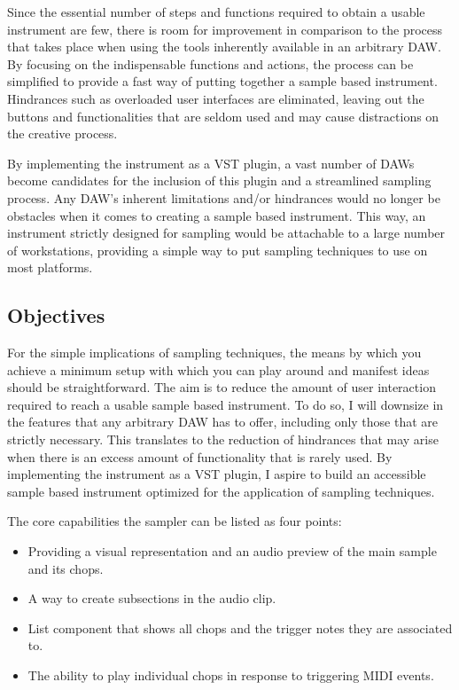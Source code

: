 \documentclass[12pt, a4paper, hidelinks]{article}
\begin{document}
	Since the essential number of steps and functions required to obtain a usable instrument are few, there is room for improvement in comparison to the process that takes place when using the tools inherently available in an arbitrary DAW. By focusing on the indispensable functions and actions, the process can be simplified to provide a fast way of putting together a sample based instrument. Hindrances such as overloaded user interfaces are eliminated, leaving out the buttons and functionalities that are seldom used and may cause distractions on the creative process. \par
	
	By implementing the instrument as a VST plugin, a vast number of DAWs become candidates for the inclusion of this plugin and a streamlined sampling process. Any DAW's inherent limitations and/or hindrances would no longer be obstacles when it comes to creating a sample based instrument. This way, an instrument strictly designed for sampling would be attachable to a large number of workstations, providing a simple way to put sampling techniques to use on most platforms.
	  

	
	
	\newpage
	\subsection{Objectives}

	For the simple implications of sampling techniques, the means by which you achieve a minimum setup with which you can play around and manifest ideas should be straightforward. The aim is to reduce the amount of user interaction required to reach a usable sample based instrument. To do so, I will downsize in the features that any arbitrary DAW has to offer, including only those that are strictly necessary. This translates to the reduction of hindrances that may arise when there is an excess amount of functionality that is rarely used.  By implementing the instrument as a VST plugin, I aspire to build an accessible sample based instrument optimized for the application  of sampling techniques. %
	\par
	The core capabilities the sampler can be listed as four points:
	\begin{itemize}
		\item Providing a visual representation and an audio preview of the main 
		sample and its chops.
		\item A way to create subsections in the audio clip.
		\item List component that shows all chops and the trigger notes they are associated to.
		\item The ability to play individual chops in response to triggering MIDI events.
	\end{itemize}
	
\end{document}
